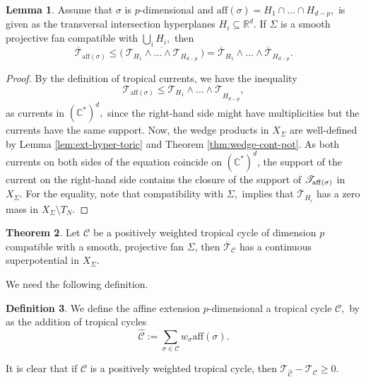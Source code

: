 \documentclass[11pt]{amsart}
\def\aff{{\rm aff}}
\theoremstyle{definition}
\newtheorem{theorem}{Theorem}[section]
\newtheorem{definition}[theorem]{Definition}
\newtheorem{lemma}[theorem]{Lemma}
\newcommand{\R}{\mathbb{R}}
\newcommand{\C}{\mathbb{C}}
\newcommand{\cC}{\mathcal{C}}
\newcommand{\sT}{\mathscr{T}}
\begin{document}
\begin{lemma}\label{lem:affine-hyper}
Assume that $\sigma$ is $p$-dimensional and  $\text{aff}(\sigma)= H_1 \cap \dots \cap H_{d-p},$ is given as the transversal intersection   hyperplanes $H_i \subseteq \R^d.$
If $\Sigma$ is a smooth projective fan compatible with $\bigcup_i H_i,$ then 
\[
\overline{\sT}_{\mathrm{aff}(\sigma)} 
\leq 
\big(~ \overline{\sT_{H_1} \wedge \dots \wedge \sT_{H_{d-p}}}~\big)
=
\overline{\sT}_{H_1} \wedge \dots \wedge \overline{\sT}_{H_{d-p}}.
\]
\end{lemma}
\begin{proof}
By the definition of tropical currents, we have the inequality 
$${\sT}_{\text{aff}(\sigma)} \leq {\sT_{H_1} \wedge \dots \wedge \sT}_{H_{d-p}},$$
as currents in $(\C^*)^d,$ since the right-hand side might have multiplicities but the currents have the same support. Now, the wedge products in $X_{\Sigma}$  are well-defined by Lemma \ref{lem:ext-hyper-toric} and Theorem \ref{thm:wedge-cont-pot}. As both currents on both sides of the equation coincide on $(\C^*)^d$, the support of the current on the right-hand side contains the closure of the support of $\sT_{\aff(\sigma)}$ in $X_{\Sigma}.$ For the equality, note that compatibility with $\Sigma,$ implies that $\overline{\sT}_{H_i}$ has a zero mass in $X_{\Sigma}\setminus T_N.$
\end{proof}
\begin{theorem}\label{thm:trop-curr-CSP}
Let $\cC$ be a positively weighted tropical cycle of dimension $p$ compatible with a smooth, projective fan $\Sigma$, then $\overline{\sT}_{\cC}$ has a continuous superpotential in $X_{\Sigma}.$   
\end{theorem}
We need the following definition.
\begin{definition}\label{def:affine-ext}
  We define the affine extension $p$-dimensional a tropical cycle $\cC,$ by as the addition of tropical cycles  $$\widehat{\cC}:= \sum_{\sigma \in \cC} w_\sigma \text{aff}(\sigma).$$
\end{definition}
It is clear that if $\cC$ is a positively weighted tropical cycle, then $\sT_{\widehat{\cC}} - \sT_{\cC} \geq 0.$
\end{document}
